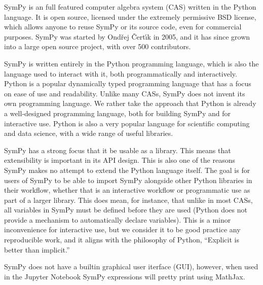 SymPy is an full featured computer algebra system (CAS) written in the Python
language. It is open source, licensed under the extremely permissive BSD
license, which allows anyone to reuse SymPy or its source code, even for
commercial purposes. SymPy was started by Ond\v{r}ej \v{C}ert\'{\i}k in 2005, and
it has since grown into a large open source project, with over 500 contributors.

SymPy is written entirely in the Python programming language, which is also
the language used to interact with it, both programmatically and
interactively. Python is a popular dynamically typed programming language that
has a focus on ease of use and readability. Unlike many CASs, SymPy does not
invent its own programming language. We rather take the approach that Python
is already a well-designed programming language, both for building SymPy and
for interactive use. Python is also a very popular language for scientific
computing and data science, with a wide range of useful libraries.

SymPy has a strong focus that it be usable as a library. This means that
extensibility is important in its API design. This is also one of the reasons
SymPy makes no attempt to extend the Python language itself. The goal is for
users of SymPy to be able to import SymPy alongside other Python libraries in
their workflow, whether that is an interactive workflow or programmatic use as
part of a larger library. This does mean, for instance, that unlike in most
CASs, all variables in SymPy must be defined before they are used (Python does
not provide a mechanism to automatically declare variables). This is a minor
inconvenience for interactive use, but we consider it to be good practice any
reproducible work, and it aligns with the philosophy of Python, ``Explicit is
better than implicit.''

SymPy does not have a builtin graphical user iterface (GUI), however, when
used in the Jupyter Notebook
SymPy expressions will pretty print using MathJax.
